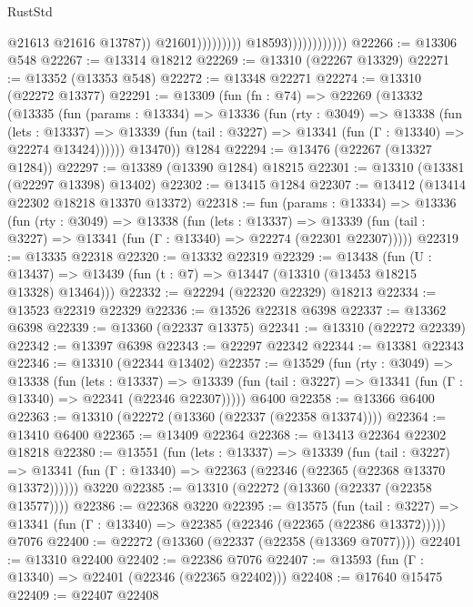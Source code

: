 \begin{lexlean}{RustStd}
\begin{coremodule}
                                                  @21613
                                                  @21616
                                                  @13787))
                                              @21601)))))))))
                            @18593))))))))))))
@22266 := @13306 @548
@22267 := @13314 @18212
@22269 := @13310 (@22267 @13329)
@22271 := @13352 (@13353 @548)
@22272 := @13348 @22271
@22274 := @13310 (@22272 @13377)
@22291 := @13309
    (fun (fn : @74) =>
    @22269
      (@13332
        (@13335
          (fun (params : @13334) =>
          @13336
            (fun (rty : @3049) =>
            @13338
              (fun (lets : @13337) =>
              @13339 (fun (tail : @3227) => @13341 (fun (Γ : @13340) => @22274 @13424))))))
        @13470))
    @1284
@22294 := @13476 (@22267 (@13327 @1284))
@22297 := @13389 (@13390 @1284) @18215
@22301 := @13310 (@13381 (@22297 @13398) @13402)
@22302 := @13415 @1284
@22307 := @13412 (@13414 @22302 @18218 @13370 @13372)
@22318 := fun (params : @13334) =>
  @13336
    (fun (rty : @3049) =>
    @13338
      (fun (lets : @13337) =>
      @13339 (fun (tail : @3227) => @13341 (fun (Γ : @13340) => @22274 (@22301 @22307)))))
@22319 := @13335 @22318
@22320 := @13332 @22319
@22329 := @13438
    (fun (U : @13437) => @13439 (fun (t : @7) => @13447 (@13310 (@13453 @18215 @13328) @13464)))
@22332 := @22294 (@22320 @22329) @18213
@22334 := @13523 @22319 @22329
@22336 := @13526 @22318 @6398
@22337 := @13362 @6398
@22339 := @13360 (@22337 @13375)
@22341 := @13310 (@22272 @22339)
@22342 := @13397 @6398
@22343 := @22297 @22342
@22344 := @13381 @22343
@22346 := @13310 (@22344 @13402)
@22357 := @13529
    (fun (rty : @3049) =>
    @13338
      (fun (lets : @13337) =>
      @13339 (fun (tail : @3227) => @13341 (fun (Γ : @13340) => @22341 (@22346 @22307)))))
    @6400
@22358 := @13366 @6400
@22363 := @13310 (@22272 (@13360 (@22337 (@22358 @13374))))
@22364 := @13410 @6400
@22365 := @13409 @22364
@22368 := @13413 @22364 @22302 @18218
@22380 := @13551
    (fun (lets : @13337) =>
    @13339
      (fun (tail : @3227) =>
      @13341 (fun (Γ : @13340) => @22363 (@22346 (@22365 (@22368 @13370 @13372))))))
    @3220
@22385 := @13310 (@22272 (@13360 (@22337 (@22358 @13577))))
@22386 := @22368 @3220
@22395 := @13575
    (fun (tail : @3227) => @13341 (fun (Γ : @13340) => @22385 (@22346 (@22365 (@22386 @13372)))))
    @7076
@22400 := @22272 (@13360 (@22337 (@22358 (@13369 @7077))))
@22401 := @13310 @22400
@22402 := @22386 @7076
@22407 := @13593 (fun (Γ : @13340) => @22401 (@22346 (@22365 @22402)))
@22408 := @17640 @15475
@22409 := @22407 @22408

\end{coremodule}
\end{lexlean}
